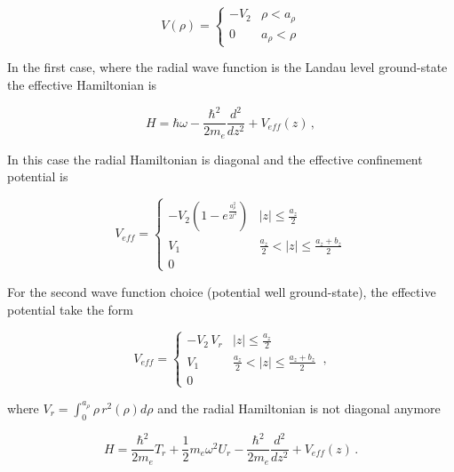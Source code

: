 \documentclass[a4paper,10pt]{article}
\begin{document}
\begin{equation}
  V(\rho) = \left\{ \begin{matrix}
                    -V_2 & \rho<a_{\rho} \\
                    0    & a_{\rho}<\rho
                    \end{matrix}\right.
\end{equation}

In the first case, where the radial wave function is the Landau level ground-state the effective Hamiltonian is

\begin{equation}
  H = \hbar \omega - \frac{\hbar^2}{2 m_e} \frac{d^2}{dz^2} + V_{eff}(z) \, ,
\end{equation}

\noindent In this case the radial Hamiltonian is diagonal and the effective confinement potential is

\begin{equation}
  V_{eff} = \left\{ \begin{matrix}
                         -V_2 \left(1 - e^{\frac{a_{\rho}^2}{2 l^2}}\right) & |z|\leq\frac{a_z}{2} \\
                         V_1  & \frac{a_z}{2}< |z| \leq \frac{a_z + b_z}{2}\\
                         0
                       \end{matrix}\right.
\end{equation}

For the second wave function choice (potential well ground-state), the
effective potential take the form

\begin{equation}
  V_{eff} = \left\{ \begin{matrix}
                         -V_2\, V_r & |z|\leq\frac{a_z}{2} \\
                         V_1  & \frac{a_z}{2}< |z| \leq \frac{a_z + b_z}{2}\\
                         0
                       \end{matrix}\right. \, ,
\end{equation}

\noindent where $V_r = \int_0^{a_{\rho}} \rho\, r^2(\rho) d\rho$ and the radial Hamiltonian is not
diagonal anymore

\begin{equation}
  H = \frac{\hbar^2}{2 m_e} T_r + \frac{1}{2} m_e \omega^2 U_r - \frac{\hbar^2}{2 m_e} \frac{d^2}{dz^2} + V_{eff}(z) \, .
\end{equation}
\end{document}
